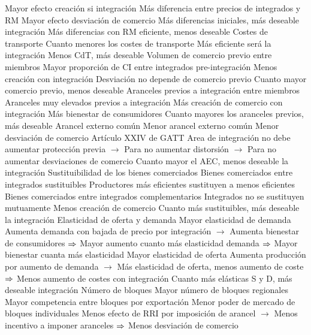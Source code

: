 \documentclass{nuevotema}
\begin{document}
\begin{esquemal}
				\4[] Mayor efecto creación si integración
				\4 Más diferencia entre precios de integrados y RM
				\4[] Mayor efecto desviación de comercio
				\4[$\then$] Más diferencias iniciales, más deseable integración
				\4[$\then$] Más diferencias con RM eficiente, menos deseable
			\3 Costes de transporte
				\4 Cuanto menores los costes de transporte
				\4[] Más eficiente será la integración
				\4[$\then$] Menos CdT, más deseable
			\3 Volumen de comercio previo entre miembros
				\4 Mayor proporción de CI entre integrados pre-integración
				\4[] Menos creación con integración
				\4 Desviación no depende de comercio previo
				\4[$\then$] Cuanto mayor comercio previo, menos deseable
			\3 Aranceles previos a integración entre miembros
				\4 Aranceles muy elevados previos a integración
				\4[] Más creación de comercio con integración
				\4[] Más bienestar de consumidores
				\4[$\then$] Cuanto mayores los aranceles previos, más deseable
			\3 Arancel externo común
				\4 Menor arancel externo común
				\4[] Menor desviación de comercio
				\4 Artículo XXIV de GATT
				\4[] Area de integración no debe aumentar protección previa
				\4[] $\to$ Para no aumentar distorsión
				\4[] $\to$ Para no aumentar desviaciones de comercio
				\4[$\then$] Cuanto mayor el AEC, menos deseable la integración
			\3 Sustituibilidad de los bienes comerciados
				\4 Bienes comerciados entre integrados sustituibles
				\4[] Productores más eficientes sustituyen a menos eficientes
				\4 Bienes comerciados entre integrados complementarios
				\4[] Integrados no se sustituyen mutuamente
				\4[] Menos creación de comercio
				\4[$\then$] Cuanto más sustituibles, más deseable la integración
			\3 Elasticidad de oferta y demanda
				\4 Mayor elasticidad de demanda
				\4[] Aumenta demanda con bajada de precio por integración
				\4[] $\to$ Aumenta bienestar de consumidores
				\4[] $\then$ Mayor aumento cuanto más elasticidad demanda
				\4[] $\then$ Mayor bienestar cuanta más elasticidad
				\4 Mayor elasticidad de oferta
				\4[] Aumenta producción por aumento de demanda
				\4[] $\to$ Más elasticidad de oferta, menos aumento de coste
				\4[] $\then$ Menos aumento de costes con integración
				\4[$\then$] Cuanto más elásticas S y D, más deseable integración
			\3 Número de bloques
				\4 Mayor número de bloques regionales
				\4[] Mayor competencia entre bloques por exportación
				\4[] Menor poder de mercado de bloques individuales
				\4[] Menos efecto de RRI por imposición de arancel
				\4[] $\to$ Menos incentivo a imponer aranceles
				\4[] $\then$ Menos desviación de comercio

\end{esquemal}
\end{document}
